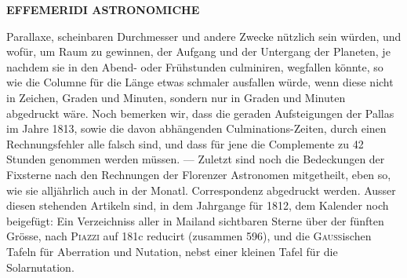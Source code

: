 \clearpage
\endgroup
\begingroup
\pagestyle{empty}
\newcommand{\GaussVIGathering}[2]{%
  \fancypagestyle{gaussVIGathering}{%
    \fancyhf{}%
    \renewcommand{\headrulewidth}{0pt}%
    \renewcommand{\footrulewidth}{0pt}%
    \fancyfoot[C]{\makebox[\textwidth][l]{%
      \hspace*{.025\textwidth}{\footnotesize\bfseries #1}\hfill
      {\normalsize\bfseries\textls[90]{#2}}\hspace*{.18\textwidth}}}%
  }%
  \thispagestyle{gaussVIGathering}%
}
\thispagestyle{empty}
\noindent{}%
\makebox[12mm][l]{}%
\parbox[t]{\dimexpr\linewidth-24mm\relax}{\centering\footnotesize\bfseries EFFEMERIDI ASTRONOMICHE\par}%
\par\nobreak\medskip
\noindent Parallaxe, scheinbaren Durchmesser und andere Zwecke nützlich sein würden, und wofür, um Raum zu gewinnen, der Aufgang und der Untergang der Planeten, je nachdem sie in den Abend- oder Frühstunden culminiren, wegfallen könnte, so wie die Columne für die Länge etwas schmaler ausfallen würde, wenn diese nicht in Zeichen, Graden und Minuten, sondern nur in Graden und Minuten abgedruckt wäre. Noch bemerken wir, dass die geraden Aufsteigungen der Pallas im Jahre 1813, sowie die davon abhängenden Culminations-Zeiten, durch einen Rechnungsfehler alle falsch sind, und dass für jene die Complemente zu 42 Stunden genommen werden müssen. --- Zuletzt sind noch die Bedeckungen der Fixsterne nach den Rechnungen der Florenzer Astronomen mitgetheilt, eben so, wie sie alljährlich auch in der Monatl. Correspondenz abgedruckt werden. Ausser diesen stehenden Artikeln sind, in dem Jahrgange für 1812, dem Kalender noch beigefügt: Ein Verzeichniss aller in Mailand sichtbaren Sterne über der fünften Grösse, nach \textsc{Piazzi} auf 181c reducirt (zusammen 596), und die \textsc{Gauss}ischen Tafeln für Aberration und Nutation, nebst einer kleinen Tafel für die Solarnutation.

